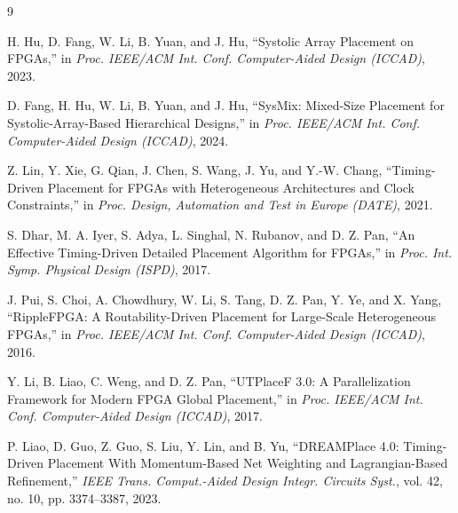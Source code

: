 \begin{thebibliography}{9}

H. Hu, D. Fang, W. Li, B. Yuan, and J. Hu,
``Systolic Array Placement on FPGAs,''
in \emph{Proc. IEEE/ACM Int. Conf. Computer-Aided Design (ICCAD)}, 2023.

D. Fang, H. Hu, W. Li, B. Yuan, and J. Hu,
``SysMix: Mixed-Size Placement for Systolic-Array-Based Hierarchical Designs,''
in \emph{Proc. IEEE/ACM Int. Conf. Computer-Aided Design (ICCAD)}, 2024.

Z. Lin, Y. Xie, G. Qian, J. Chen, S. Wang, J. Yu, and Y.-W. Chang,
``Timing-Driven Placement for FPGAs with Heterogeneous Architectures and Clock Constraints,''
in \emph{Proc. Design, Automation and Test in Europe (DATE)}, 2021.

S. Dhar, M. A. Iyer, S. Adya, L. Singhal, N. Rubanov, and D. Z. Pan,
``An Effective Timing-Driven Detailed Placement Algorithm for FPGAs,''
in \emph{Proc. Int. Symp. Physical Design (ISPD)}, 2017.

J. Pui, S. Choi, A. Chowdhury, W. Li, S. Tang, D. Z. Pan, Y. Ye, and X. Yang,
``RippleFPGA: A Routability-Driven Placement for Large-Scale Heterogeneous FPGAs,''
in \emph{Proc. IEEE/ACM Int. Conf. Computer-Aided Design (ICCAD)}, 2016.

Y. Li, B. Liao, C. Weng, and D. Z. Pan,
``UTPlaceF 3.0: A Parallelization Framework for Modern FPGA Global Placement,''
in \emph{Proc. IEEE/ACM Int. Conf. Computer-Aided Design (ICCAD)}, 2017.

P. Liao, D. Guo, Z. Guo, S. Liu, Y. Lin, and B. Yu,
``DREAMPlace 4.0: Timing-Driven Placement With Momentum-Based Net Weighting and Lagrangian-Based Refinement,''
\emph{IEEE Trans. Comput.-Aided Design Integr. Circuits Syst.}, vol. 42, no. 10, pp. 3374--3387, 2023.

\end{thebibliography}
